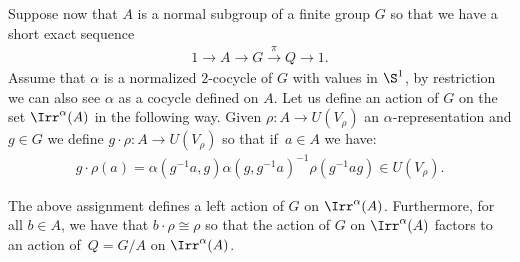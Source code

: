 Suppose now that $A$ is a normal subgroup of a finite group $G$ so that we have a short exact
sequence
\begin{gather*}
1\rightarrow A\rightarrow G\stackrel{\pi}{\rightarrow} Q\rightarrow 1.
\end{gather*}
Assume that $\alpha$ is a normalized $2$-cocycle of $G$ with values in $\S^{1}$,
by restriction we can also see $\alpha$ as a cocycle defined on $A$.
Let us define an action of $G$ on the set $\Irr^{\alpha}(A)$ in the following way.
Given $\rho\colon A\rightarrow U(V_{\rho})$ an $\alpha$-representation and $g\in G$ we define
$g\cdot \rho\colon A\rightarrow U(V_{\rho})$ so that if~$a\in A$ we have:
\begin{gather}\label{def:act}
g\cdot \rho(a)=\alpha(g^{-1}a,g)\alpha(g,g^{-1}a)^{-1}\rho(g^{-1}ag)\in U(V_{\rho}).
\end{gather}

\begin{Pro}
The above assignment defines a left action of $G$ on $\Irr^{\alpha}(A)$. Furthermore, for all
$b\in A$, we have that $b\cdot\rho\cong\rho$ so that the action of $G$ on $\Irr^{\alpha}(A)$
factors to an action of~$Q=G/A$ on $\Irr^{\alpha}(A)$.
\end{Pro}

